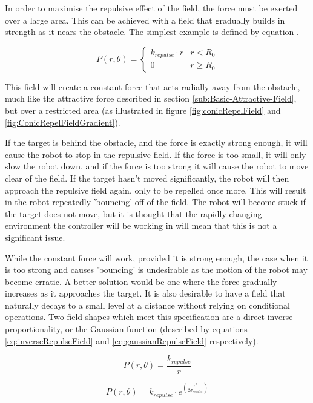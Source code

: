 \documentclass[10pt]{article}
\begin{document}
In order to maximise the repulsive effect of the field, the force must be
exerted over a large area. This can be achieved with a field that gradually
builds in strength as it nears the obstacle. The simplest example is defined by
equation .

\[
P\left(r,\theta\right)=\begin{cases}
k_{repulse}\cdot r & r<R_{0}\\
0 & r\geq R_{0}
\end{cases}
\]

This field will create a constant force that acts radially away from the
obstacle, much like the attractive force described in section
\ref{sub:Basic-Attractive-Field}, but over a restricted area (as illustrated in
figure \ref{fig:conicRepelField} and \ref{fig:ConicRepelFieldGradient}). 

If the target is behind the obstacle, and the force is exactly strong enough, it
will cause the robot to stop in the repulsive field. If the force is too small,
it will only slow the robot down, and if the force is too strong it will cause
the robot to move clear of the field. If the target hasn't moved significantly,
the robot will then approach the repulsive field again, only to be repelled once
more. This will result in the robot repeatedly 'bouncing' off of the field. The
robot will become stuck if the target does not move, but it is thought that the
rapidly changing environment the controller will be working in will mean that
this is not a significant issue.

While the constant force will work, provided it is strong enough, the case when
it is too strong and causes 'bouncing' is undesirable as the motion of the robot
may become erratic. A better solution would be one where the force gradually
increases as it approaches the target. It is also desirable to have a field that
naturally decays to a small level at a distance without relying on conditional
operations. Two field shapes which meet this specification are a direct inverse
proportionality, or the Gaussian function (described by equations
\ref{eq:inverseRepulseField} and \ref{eq:gaussianRepulseField} respectively).

\begin{equation}
P\left(r,\theta\right)=\frac{k_{repulse}}{r}\label{eq:inverseRepulseField}
\end{equation}

\begin{equation}
P\left(r,\theta\right)=k_{repulse}\cdot e^{\left(\frac{r^{2}}{2\sigma_{repulse}}\right)}\label{eq:gaussianRepulseField}
\end{equation}
\end{document}
